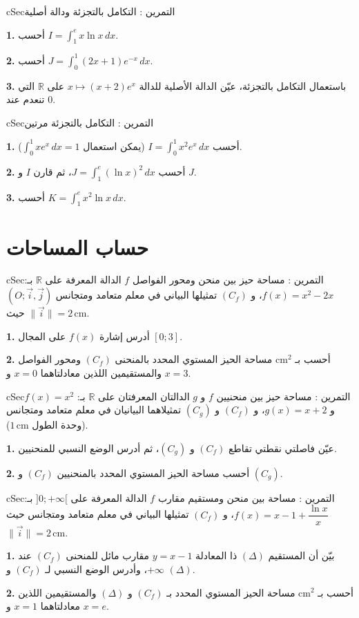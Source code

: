 \documentclass[12pt,a4paper]{article}
\newenvironment{BOX}[2]{\begin{otherlanguage}{english}\begin{arbox}{#1}{#2}}{\end{arbox}\end{otherlanguage}}
\newcounter{exo}
\newenvironment{tamrin}[1]{\stepcounter{exo}\begin{BOX}{cSec}{التمرين \theexo: #1}}{\end{BOX}}
\newcommand{\R}{\mathbb{R}}
\newcommand{\QQ}[1]{\par\smallskip\textbf{#1.} }
\begin{document}
\begin{tamrin}{التكامل بالتجزئة ودالة أصلية}
\QQ{1} أحسب $I=\displaystyle\int_1^ex\ln x\,dx$.
\QQ{2} أحسب $J=\displaystyle\int_0^1(2x+1)e^{-x}\,dx$.
\QQ{3} باستعمال التكامل بالتجزئة، عيّن الدالة الأصلية للدالة $x\mapsto(x+2)e^{x}$ على $\R$ التي تنعدم عند $0$.
\end{tamrin}

\begin{tamrin}{التكامل بالتجزئة مرتين}
\QQ{1} أحسب $I=\displaystyle\int_0^1x^{2}e^{x}\,dx$ (يمكن استعمال $\displaystyle\int_0^1xe^{x}\,dx=1$).
\QQ{2} أحسب $J=\displaystyle\int_1^e(\ln x)^{2}\,dx$، ثم قارن $I$ و $J$.
\QQ{3} أحسب $K=\displaystyle\int_1^ex^{2}\ln x\,dx$.
\end{tamrin}

\section{حساب المساحات}

\begin{tamrin}{مساحة حيز بين منحن ومحور الفواصل}
$f$ الدالة المعرفة على $\R$ بـ: $f(x)=x^{2}-2x$، و $(C_f)$ تمثيلها البياني في معلم متعامد ومتجانس $\left(O;\vec i,\vec j\right)$ حيث $\|\vec i\|=2\,\text{cm}$.
\QQ{1} أدرس إشارة $f(x)$ على المجال $[0;3]$.
\QQ{2} أحسب بـ $\text{cm}^{2}$ مساحة الحيز المستوي المحدد بالمنحنى $(C_f)$ ومحور الفواصل والمستقيمين اللذين معادلتاهما $x=0$ و $x=3$.
\end{tamrin}

\begin{tamrin}{مساحة حيز بين منحنيين}
$f$ و $g$ الدالتان المعرفتان على $\R$ بـ: $f(x)=x^{2}$ و $g(x)=x+2$، و $(C_f)$ و $(C_g)$ تمثيلاهما البيانيان في معلم متعامد ومتجانس (وحدة الطول $1\,\text{cm}$).
\QQ{1} عيّن فاصلتي نقطتي تقاطع $(C_f)$ و $(C_g)$، ثم أدرس الوضع النسبي للمنحنيين.
\QQ{2} أحسب مساحة الحيز المستوي المحدد بالمنحنيين $(C_f)$ و $(C_g)$.
\end{tamrin}

\begin{tamrin}{مساحة بين منحن ومستقيم مقارب}
$f$ الدالة المعرفة على $]0;+\infty[$ بـ: $f(x)=x-1+\dfrac{\ln x}{x}$، و $(C_f)$ تمثيلها البياني في معلم متعامد ومتجانس حيث $\|\vec i\|=2\,\text{cm}$.
\QQ{1} بيّن أن المستقيم $(\Delta)$ ذا المعادلة $y=x-1$ مقارب مائل للمنحنى $(C_f)$ عند $+\infty$، وأدرس الوضع النسبي لـ $(C_f)$ و $(\Delta)$.
\QQ{2} أحسب بـ $\text{cm}^{2}$ مساحة الحيز المستوي المحدد بـ $(C_f)$ و $(\Delta)$ والمستقيمين اللذين معادلتاهما $x=1$ و $x=e$.
\end{tamrin}
\end{document}
